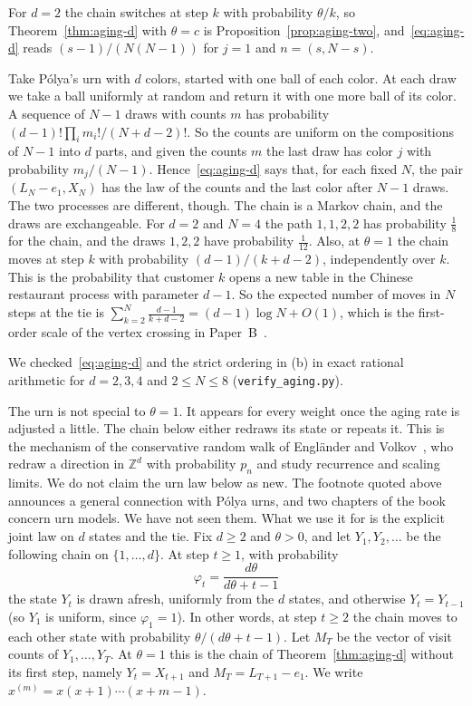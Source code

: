 \begin{remark}\label{rem:aging-d}
For $d=2$ the chain switches at step $k$ with probability $\theta/k$, so
Theorem~\ref{thm:aging-d} with $\theta=c$ is
Proposition~\ref{prop:aging-two}, and~\eqref{eq:aging-d} reads
$(s-1)/(N(N-1))$ for $j=1$ and $n=(s,N-s)$.

Take P\'olya's urn with $d$ colors, started with one ball of each color. At
each draw we take a ball uniformly at random and return it with one more
ball of its color. A sequence of $N-1$ draws with counts $m$ has probability
$(d-1)!\prod_im_i!/(N+d-2)!$. So the counts are uniform on the compositions
of $N-1$ into $d$ parts, and given the counts $m$ the last draw has color $j$
with probability $m_j/(N-1)$. Hence~\eqref{eq:aging-d} says that, for each
fixed $N$, the pair $(L_N-e_1,X_N)$ has the law of the counts and the last
color after $N-1$ draws. The two processes are different, though. The
chain is a Markov chain, and the draws are exchangeable. For $d=2$ and $N=4$
the path $1,1,2,2$ has probability $\frac18$ for the chain, and the draws
$1,2,2$ have probability $\frac1{12}$. Also, at $\theta=1$ the chain moves at
step $k$ with probability $(d-1)/(k+d-2)$, independently over $k$. This is
the probability that customer $k$ opens a new table in the Chinese restaurant
process with parameter $d-1$. So the expected number of moves in $N$ steps at
the tie is $\sum_{k=2}^N\frac{d-1}{k+d-2}=(d-1)\log N+O(1)$, which is the
first-order scale of the vertex crossing in Paper~B~\cite{paperB}.

We checked~\eqref{eq:aging-d} and the strict ordering in (b) in exact
rational arithmetic for $d=2,3,4$ and $2\le N\le8$
(\texttt{verify\_aging.py}).
\end{remark}

The urn is not special to $\theta=1$. It appears for every weight once the
aging rate is adjusted a little. The chain below either redraws its state or
repeats it. This is the mechanism of the conservative random walk of
Engl\"ander and Volkov~\cite{ev2022}, who redraw a direction in $\mathbb Z^d$
with probability $p_n$ and study recurrence and scaling limits. We do not
claim the urn law below as new. The footnote quoted above announces a general
connection with P\'olya urns, and two chapters of the book~\cite{ev2024} concern
urn models. We have not seen them. What we use it for is the explicit joint law on
$d$ states and the tie. Fix $d\ge2$ and $\theta>0$, and let
$Y_1,Y_2,\dots$ be the following chain on $\{1,\dots,d\}$. At step $t\ge1$,
with probability
\[
 \varphi_t=\frac{d\theta}{d\theta+t-1}
\]
the state $Y_t$ is drawn afresh, uniformly from the $d$ states, and otherwise
$Y_t=Y_{t-1}$ (so $Y_1$ is uniform, since $\varphi_1=1$). In other words, at
step $t\ge2$ the chain moves to each other state with probability
$\theta/(d\theta+t-1)$. Let $M_T$ be the vector of visit counts of
$Y_1,\dots,Y_T$. At $\theta=1$ this is the chain of
Theorem~\ref{thm:aging-d} without its first step, namely $Y_t=X_{t+1}$ and
$M_T=L_{T+1}-e_1$. We write $x^{(m)}=x(x+1)\cdots(x+m-1)$.

